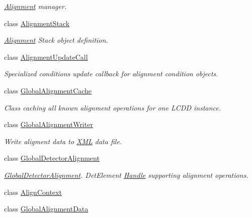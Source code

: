 \begin{DoxyCompactItemize}
\begin{DoxyCompactList}\small\item\em \hyperlink{class_d_d4hep_1_1_alignments_1_1_alignment}{Alignment} manager. \item\end{DoxyCompactList}\item 
class \hyperlink{class_d_d4hep_1_1_alignments_1_1_alignment_stack}{AlignmentStack}
\begin{DoxyCompactList}\small\item\em \hyperlink{class_d_d4hep_1_1_alignments_1_1_alignment}{Alignment} Stack object definition. \item\end{DoxyCompactList}\item 
class \hyperlink{class_d_d4hep_1_1_alignments_1_1_alignment_update_call}{AlignmentUpdateCall}
\begin{DoxyCompactList}\small\item\em Specialized conditions update callback for alignment condition objects. \item\end{DoxyCompactList}\item 
class \hyperlink{class_d_d4hep_1_1_alignments_1_1_global_alignment_cache}{GlobalAlignmentCache}
\begin{DoxyCompactList}\small\item\em Class caching all known alignment operations for one LCDD instance. \item\end{DoxyCompactList}\item 
class \hyperlink{class_d_d4hep_1_1_alignments_1_1_global_alignment_writer}{GlobalAlignmentWriter}
\begin{DoxyCompactList}\small\item\em Write aligment data to \hyperlink{namespace_d_d4hep_1_1_x_m_l}{XML} data file. \item\end{DoxyCompactList}\item 
class \hyperlink{class_d_d4hep_1_1_alignments_1_1_global_detector_alignment}{GlobalDetectorAlignment}
\begin{DoxyCompactList}\small\item\em \hyperlink{class_d_d4hep_1_1_alignments_1_1_global_detector_alignment}{GlobalDetectorAlignment}. DetElement \hyperlink{class_d_d4hep_1_1_handle}{Handle} supporting alignment operations. \item\end{DoxyCompactList}\item 
class \hyperlink{class_d_d4hep_1_1_alignments_1_1_align_context}{AlignContext}
\item 
class \hyperlink{class_d_d4hep_1_1_alignments_1_1_global_alignment_data}{GlobalAlignmentData}
\end{DoxyCompactItemize}
